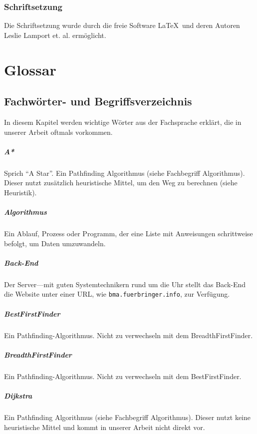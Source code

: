 \subsection{Schriftsetzung}
Die Schriftsetzung wurde durch die freie Software \LaTeX\  und deren Autoren Leslie Lamport et. al. ermöglicht.

\chapter{Glossar}
\section*{Fachwörter- und Begriffsverzeichnis}
In diesem Kapitel werden wichtige Wörter aus der Fachsprache erklärt, die in unserer Arbeit oftmals vorkommen.
\paragraph{A*} Sprich ``A Star''. Ein Pathfinding Algorithmus (siehe Fachbegriff Algorithmus). Dieser nutzt zusätzlich heuristische Mittel, um den Weg zu berechnen (siehe Heuristik).
\paragraph{Algorithmus} Ein Ablauf, Prozess oder Programm, der eine Liste mit Anweisungen schrittweise befolgt, um Daten umzuwandeln.
\paragraph{Back-End} Der Server---mit guten Systemtechnikern rund um die Uhr stellt das Back-End die Website unter einer URL, wie \texttt{bma.fuerbringer.info}, zur Verfügung.
\paragraph{BestFirstFinder} Ein Pathfinding-Algorithmus. Nicht zu verwechseln mit dem BreadthFirstFinder.
\paragraph{BreadthFirstFinder} Ein Pathfinding-Algorithmus. Nicht zu verwechseln mit dem BestFirstFinder.
\paragraph{Dijkstra} Ein Pathfinding Algorithmus (siehe Fachbegriff Algorithmus). Dieser nutzt keine heuristische Mittel und kommt in unserer Arbeit nicht direkt vor.
